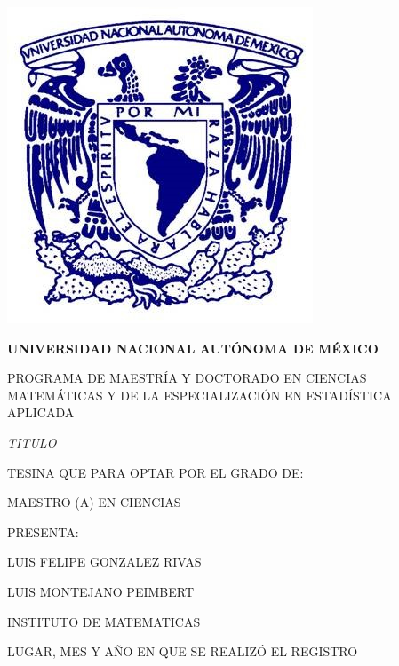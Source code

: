 \thispagestyle{empty}
\centering
\includegraphics[scale=0.5]{logo-unam.jpg}

\begin{center}
    \LARGE \textbf{UNIVERSIDAD NACIONAL AUTÓNOMA DE MÉXICO}
    \vspace{0.2cm}
   
    \Large PROGRAMA DE MAESTRÍA Y DOCTORADO EN CIENCIAS MATEMÁTICAS Y DE LA ESPECIALIZACIÓN EN ESTADÍSTICA APLICADA
    \vspace{3.0cm}

    \Large \textit{TITULO}
    \vspace{1.2cm}

    \Large TESINA QUE PARA OPTAR POR EL GRADO DE:
    
    MAESTRO (A) EN CIENCIAS
    \vspace{1.2cm}

    \Large PRESENTA:
    
    LUIS FELIPE GONZALEZ RIVAS
    \vspace{1.5cm}

    \Large LUIS MONTEJANO PEIMBERT
    
    INSTITUTO DE MATEMATICAS  %
    \vspace{1.5cm}

    \Large LUGAR, MES Y AÑO EN QUE SE REALIZÓ EL REGISTRO
\end{center}
\newpage